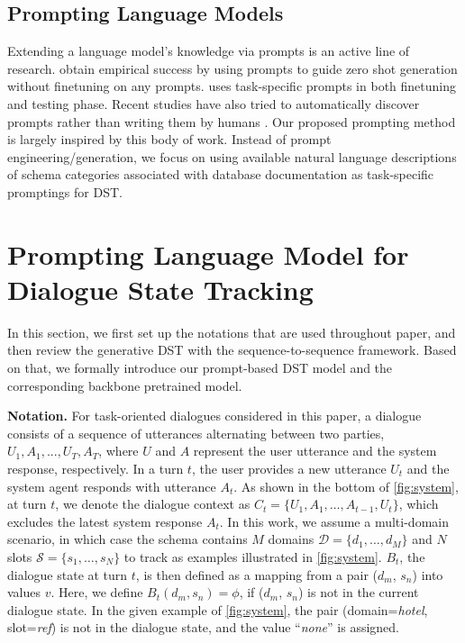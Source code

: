 \documentclass[11pt]{article}
\begin{document}
\subsection{Prompting Language Models}
Extending a language model’s knowledge via prompts is an active line of research. \citet{radford2019language} obtain empirical success by using prompts to guide zero shot generation without finetuning on any prompts. \citet{raffel2020exploring} uses task-specific prompts in both finetuning and testing phase. Recent studies have also tried to automatically discover prompts rather than writing them by humans \cite{jiang2020can}. Our proposed prompting method is largely inspired by this body of work. Instead of prompt engineering/generation, we focus on using available natural language descriptions of schema categories associated with database documentation as task-specific promptings for DST.





 

\section{Prompting Language Model for Dialogue State Tracking}
In this section, we first set up the notations that are used throughout paper, and then review the generative DST with the sequence-to-sequence framework.
Based on that, we formally introduce our prompt-based DST model and the corresponding backbone pretrained model.

\noindent
\textbf{Notation.}
For task-oriented dialogues considered in this paper,
a dialogue consists of a sequence of utterances alternating between two parties, $U_{1}, A_{1}, ..., U_{T}, A_{T}$,
where $U$ and $A$ represent the user utterance and the system response, respectively.
In a turn $t$, the user provides a new utterance \textit{$U_{t}$} and the system agent responds with utterance \textit{$A_{t}$}.
As shown in the bottom of \autoref{fig:system}, at turn $t$, we denote the dialogue context as $C_t=\{U_{1}, A_{1}, \ldots, A_{t-1}, U_{t}\}$, which excludes the latest system response $A_t$.
In this work, we assume a multi-domain scenario, in which case the schema contains $M$ domains $\mathcal{D}=\{d_1, \ldots, d_M\}$ and
$N$ slots $\mathcal{S}=\{s_1, \ldots, s_N\}$ to track as examples illustrated in \autoref{fig:system}.
$B_t$, the dialogue state at turn $t$, is then defined as a mapping from a pair ($d_m$, $s_n$) into values $v$.
Here, we define $B_t(d_m, s_n)=\phi$, if ($d_m$, $s_n$) is not in the current dialogue state.
In the given example of \autoref{fig:system}, the pair (domain=\textit{hotel}, slot=\textit{ref}) is not in the dialogue state, and the value ``\textit{none}'' is assigned.
\end{document}
